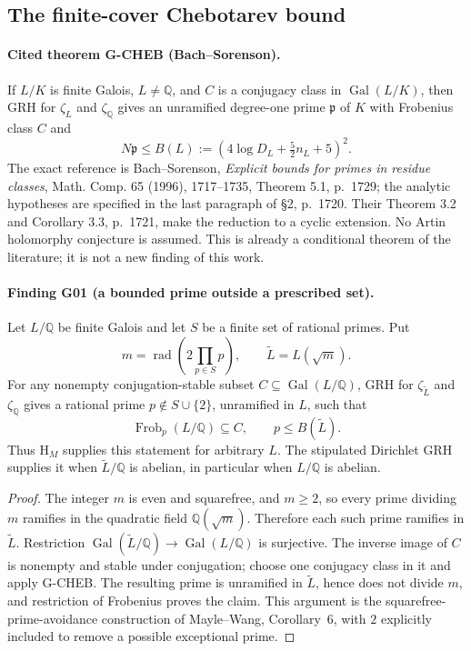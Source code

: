 \documentclass[11pt,a4paper]{article}
\begin{document}
\subsection{The finite-cover Chebotarev bound}

\paragraph{Cited theorem G-CHEB (Bach--Sorenson).}
If $L/K$ is finite Galois, $L\ne\mathbb Q$, and $C$ is a conjugacy class in $\operatorname{Gal}(L/K)$, then GRH for $\zeta_L$ and $\zeta_{\mathbb Q}$ gives an unramified degree-one prime $\mathfrak p$ of $K$ with Frobenius class $C$ and
\[
 N\mathfrak p\le B(L):=(4\log D_L+\tfrac52 n_L+5)^2.
\]
The exact reference is Bach--Sorenson, \emph{Explicit bounds for primes in residue classes}, Math. Comp. 65 (1996), 1717--1735, Theorem 5.1, p.~1729; the analytic hypotheses are specified in the last paragraph of \S2, p.~1720.  Their Theorem 3.2 and Corollary 3.3, p.~1721, make the reduction to a cyclic extension.  No Artin holomorphy conjecture is assumed.  This is already a conditional theorem of the literature; it is not a new finding of this work.

\paragraph{Finding G01 (a bounded prime outside a prescribed set).}
Let $L/\mathbb Q$ be finite Galois and let $S$ be a finite set of rational primes. Put
\[
 m=\operatorname{rad}\!\left(2\prod_{p\in S}p\right),\qquad
 \widetilde L=L(\sqrt m).
\]
For any nonempty conjugation-stable subset $C\subseteq\operatorname{Gal}(L/\mathbb Q)$, GRH for $\zeta_{\widetilde L}$ and $\zeta_{\mathbb Q}$ gives a rational prime $p\notin S\cup\{2\}$, unramified in $L$, such that
\[
 \operatorname{Frob}_p(L/\mathbb Q)\subseteq C,
 \qquad p\le B(\widetilde L).
\]
Thus $\mathrm{H}_M$ supplies this statement for arbitrary $L$. The stipulated Dirichlet GRH supplies it when $\widetilde L/\mathbb Q$ is abelian, in particular when $L/\mathbb Q$ is abelian.

\begin{proof}
The integer $m$ is even and squarefree, and $m\ge2$, so every prime dividing $m$ ramifies in the quadratic field $\mathbb Q(\sqrt m)$.  Therefore each such prime ramifies in $\widetilde L$.  Restriction $\operatorname{Gal}(\widetilde L/\mathbb Q)\to\operatorname{Gal}(L/\mathbb Q)$ is surjective.  The inverse image of $C$ is nonempty and stable under conjugation; choose one conjugacy class in it and apply G-CHEB.  The resulting prime is unramified in $\widetilde L$, hence does not divide $m$, and restriction of Frobenius proves the claim.  This argument is the squarefree-prime-avoidance construction of Mayle--Wang, Corollary~6, with $2$ explicitly included to remove a possible exceptional prime.
\end{proof}
\end{document}
